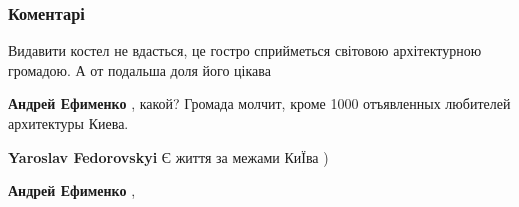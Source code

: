  
 
 
 
 
\subsubsection{Коментарі}

\begin{itemize}
 
Видавити костел не вдасться, це гостро сприйметься світовою архітектурною громадою.
А от подальша доля його цікава

\begin{itemize}
 
\textbf{Андрей Ефименко} , какой? Громада молчит, кроме 1000 отъявленных любителей архитектуры Киева.

 
\textbf{Yaroslav Fedorovskyi}
Є життя за межами КиЇва )

 
\textbf{Андрей Ефименко} ,👏
\end{itemize}

 

\end{itemize}
